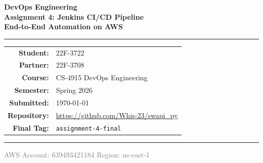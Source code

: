 \documentclass[12pt,a4paper]{article}
\begin{document}
\begin{titlepage}
  \centering
  \vspace*{2cm}

  {\huge\bfseries\color{primaryblue} DevOps Engineering\\[0.4em]
   \Large Assignment 4: Jenkins CI/CD Pipeline\\[0.2em]
   \large End-to-End Automation on AWS}

  \vspace{1.5cm}
  \rule{0.6\linewidth}{0.5pt}
  \vspace{1cm}

  \begin{tabular}{rl}
    \textbf{Student:}    & 22F-3722 \\
    \textbf{Partner:}    & 22F-3708 \\
    \textbf{Course:}     & CS-4915 DevOps Engineering \\
    \textbf{Semester:}   & Spring 2026 \\
    \textbf{Submitted:}  & \today \\
    \textbf{Repository:} & \url{https://github.com/Whis-23/swapi_py} \\
    \textbf{Final Tag:}  & \texttt{assignment-4-final} \\
  \end{tabular}

  \vspace{1.5cm}
  \rule{0.6\linewidth}{0.5pt}

  \vspace{1cm}
  \begin{abstract}
    \noindent
    This report documents the implementation of a complete Jenkins-based CI/CD pipeline
    on AWS for the SWAPI Flask application. Seven tasks are covered: Jenkins infrastructure
    provisioning with Terraform; a declarative multi-stage pipeline with parallel test
    execution; a Groovy shared library; SonarQube static analysis and quality-gate
    enforcement; Docker multi-stage builds with Trivy security scanning and ECR push;
    Terraform-driven infrastructure pipeline; and a blue-green zero-downtime deployment
    to AWS ALB-fronted ASGs. Observability is provided by Prometheus and Grafana.
  \end{abstract}

  \vfill
  \textcolor{gray}{\small AWS Account: 639493421184 \quad Region: us-east-1}
\end{titlepage}
\end{document}

